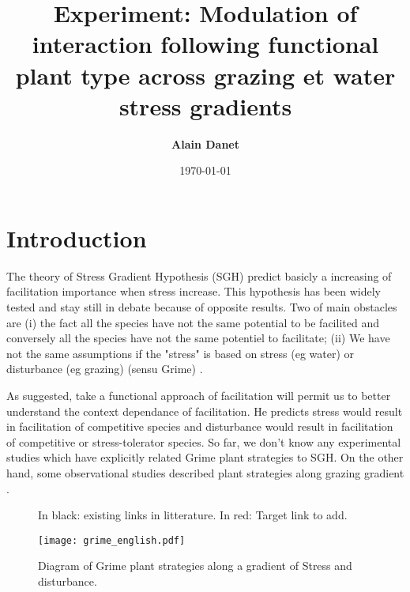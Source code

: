 \documentclass[12pt]{article} %
\title{Experiment: Modulation of interaction following functional plant type across grazing et water stress gradients}
\author{\textbf{Alain Danet}}
\date{\today}
\begin{document}
\maketitle


\part{Introduction}
The theory of Stress Gradient Hypothesis (SGH) predict basicly a increasing of facilitation importance when stress increase. This hypothesis has been widely tested and stay still in debate because of opposite results. Two of main obstacles are (i) the fact all the species have not the same potential to be facilited and conversely all the species have not the same potentiel to facilitate; (ii) We have not the same assumptions if the "stress" is based on stress (eg water) or disturbance (eg grazing) (sensu Grime) \citep{Maestre2009}. 

As \citet{Butterfield2013} suggested, take a functional approach of facilitation will permit us to better understand the context dependance of facilitation. He predicts stress would result in facilitation of competitive species and disturbance would result in facilitation of competitive or stress-tolerator species. So far, we don't know any experimental studies which have explicitly related Grime plant strategies to SGH. On the other hand, some observational studies described plant strategies along grazing gradient \citep{DIAZ2007}. 

\begin{figure}
\begin{center}
\end{center}
\caption{In black: existing links in litterature. In red: Target link to add.}
\end{figure}


\begin{figure}
\begin{center}
\texttt{[image: grime\_english.pdf]}
\end{center}
\caption{Diagram of Grime plant strategies along a gradient of Stress and disturbance.\label{Grime}}
\end{figure}
\end{document}

